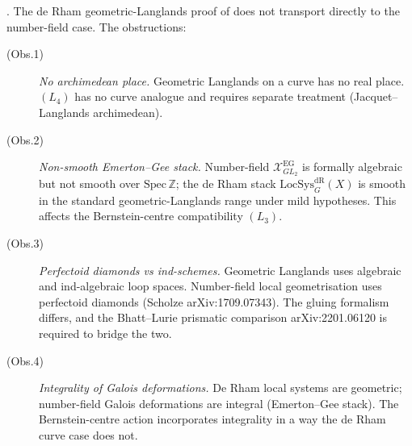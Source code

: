 \begin{theorem}
\label{v4-arith:acd:thm:transport-obstructions}
\ClaimStatusProvedHere. The de Rham geometric-Langlands proof of
 does not transport directly
to the number-field case. The obstructions:
\begin{description}
\item[(Obs.1)] \emph{No archimedean place.} Geometric Langlands on a
curve has no real place. \((L_{4})\) has no curve analogue
and requires separate treatment (Jacquet--Langlands archimedean).
\item[(Obs.2)] \emph{Non-smooth Emerton--Gee stack.} Number-field
\(\mathcal{X}^{\mathrm{EG}}_{GL_{2}}\) is formally algebraic but not
smooth over \(\mathrm{Spec}\,\mathbb{Z}\); the de Rham stack
\(\mathrm{LocSys}^{\mathrm{dR}}_{G}(X)\) is smooth in the standard
geometric-Langlands range
under mild hypotheses. This affects the Bernstein-centre
compatibility \((L_{3})\).
\item[(Obs.3)] \emph{Perfectoid diamonds vs ind-schemes.}
Geometric Langlands uses algebraic and ind-algebraic loop spaces.
Number-field local geometrisation uses perfectoid diamonds (Scholze
arXiv:1709.07343). The gluing formalism differs, and the
Bhatt--Lurie prismatic comparison arXiv:2201.06120 is required to
bridge the two.
\item[(Obs.4)] \emph{Integrality of Galois deformations.}
De Rham local systems are geometric; number-field Galois
deformations are integral (Emerton--Gee stack). The Bernstein-centre
action incorporates integrality in a way the de Rham curve case
does not.
\end{description}
\end{theorem}

